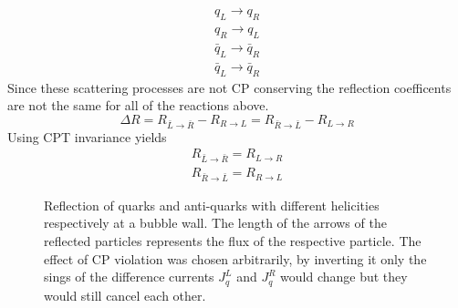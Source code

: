 \begin{align*}
	q_L\rightarrow q_R\\
	q_R\rightarrow q_L\\
	\bar{q}_L\rightarrow \bar{q}_R\\
	\bar{q}_L\rightarrow \bar{q}_R
\end{align*}
Since these scattering processes are not CP conserving the reflection coefficents are not the same for all of the reactions above.
\begin{equation}
	\Delta R=R_{\bar{L}\rightarrow\bar{R}}-R_{R\rightarrow L}=R_{\bar{R}\rightarrow\bar{L}}-R_{L\rightarrow R}
	\label{eq:reflection_coeff}
\end{equation}
Using CPT invariance yields
\begin{align}
	R_{\bar{L}\rightarrow\bar{R}}=R_{L\rightarrow R}\\
	R_{\bar{R}\rightarrow\bar{L}}=R_{R\rightarrow L}
\end{align}
\begin{figure}
	\centering
	\caption{Reflection of quarks and anti-quarks with different helicities respectively at a bubble wall. The length of the arrows of the reflected particles represents the flux of the respective particle. The effect of CP violation was chosen arbitrarily, by inverting it only the sings of the difference currents $J^L_q$ and $J^R_q$ would change but they would still cancel each other.}
	\label{fig:reflection}
\end{figure}
